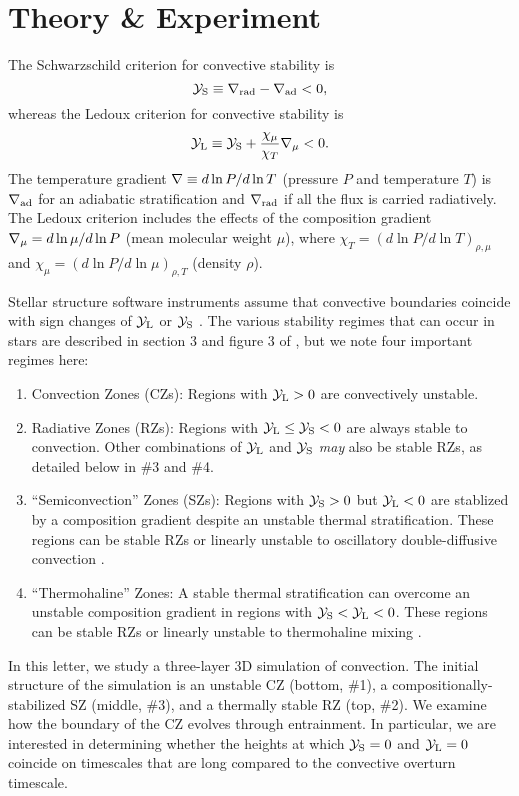 \section{Theory \& Experiment}
\label{sec:theory}
The Schwarzschild criterion for convective stability is
\begin{equation}
    \yS \equiv \gradrad - \gradad < 0,
    \label{eqn:yS}
\end{equation}
whereas the Ledoux criterion for convective stability is
\begin{equation}
    \yL \equiv \yS +  \frac{\chi_\mu}{\chi_T}\gradmu < 0.
    \label{eqn:yL}
\end{equation}
The temperature gradient $\nabla \equiv d \ln P / d \ln T$ (pressure $P$ and temperature $T$) is $\nabla_{\rm{ad}}$ for an adiabatic stratification and $\nabla_{\rm{rad}}$ if all the flux is carried radiatively.
The Ledoux criterion includes the effects of the composition gradient $\nabla_{\mu} = d\ln\mu/d\ln P$ (mean molecular weight $\mu$), where $\chi_T = (d\ln P / d\ln T)_{\rho,\mu}$ and $\chi_\mu = (d\ln P / d\ln\mu)_{\rho,T}$ (density $\rho$).

Stellar structure software instruments assume that convective boundaries coincide with sign changes of $\mathcal{Y}_{\rm{L}}$ or $\mathcal{Y}_{\rm{S}}$ \citep[][sec.~2]{mesa4}.
The various stability regimes that can occur in stars are described in section 3 and figure 3 of \citet{salaris_cassisi_2017}, but we note four important regimes here:
\begin{enumerate}
    \item Convection Zones (CZs): Regions with ${\mathcal{Y}_{\rm{L}} > 0}$ are convectively unstable.
    \item Radiative Zones (RZs): Regions with $\mathcal{Y}_{\rm{L}} \leq \mathcal{Y}_{\rm{S}} < 0$ are always stable to convection.
        Other combinations of $\mathcal{Y}_{\rm{L}}$ and $\mathcal{Y}_{\rm{S}}$ \emph{may} also be stable RZs, as detailed below in \#3 and \#4.
    \item ``Semiconvection'' Zones (SZs): Regions with ${\mathcal{Y}_{\rm{S}} > 0}$ but $\mathcal{Y}_{\rm{L}} < 0$ are stablized by a composition gradient despite an unstable thermal stratification.
        These regions can be stable RZs or linearly unstable to oscillatory double-diffusive convection \citep[ODDC, see][chapters 2 and 4]{garaud_2018}.
    \item ``Thermohaline'' Zones: A stable thermal stratification can overcome an unstable composition gradient in regions with $\mathcal{Y}_{\rm{S}} < \mathcal{Y}_{\rm{L}} < 0$.
        These regions can be stable RZs or linearly unstable to thermohaline mixing \citep[see][chapters 2 and 3]{garaud_2018}.
\end{enumerate}
In this letter, we study a three-layer 3D simulation of convection.
The initial structure of the simulation is an unstable CZ (bottom, \#1), a compositionally-stabilized SZ (middle, \#3), and a thermally stable RZ (top, \#2).
We examine how the boundary of the CZ evolves through entrainment.
In particular, we are interested in determining whether the heights at which $\mathcal{Y}_{\rm{S}} = 0$ and $\mathcal{Y}_{\rm{L}} = 0$ coincide on timescales that are long compared to the convective overturn timescale.

